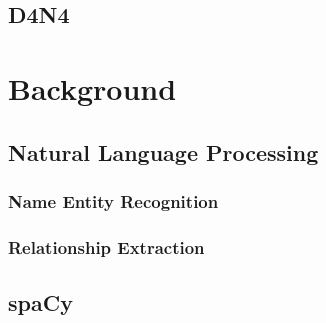 \documentclass[english]{ttlab-qualify}
\begin{document}
\section{D4N4}

\chapter{Background}
\section{Natural Language Processing}
\subsection{Name Entity Recognition}
\subsection{Relationship Extraction}
\section{spaCy}
\end{document}
